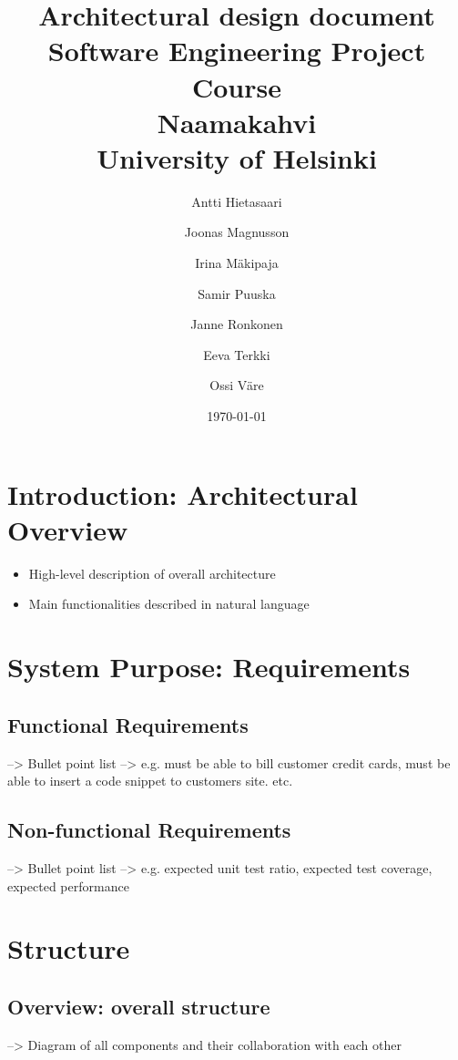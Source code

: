 \documentclass[11pt]{article}
\title{Architectural design document\\
  Software Engineering Project Course\\
  Naamakahvi\\
  University of Helsinki}
\author{Antti Hietasaari
  \and Joonas Magnusson
  \and Irina Mäkipaja
  \and Samir Puuska
  \and Janne Ronkonen
  \and Eeva Terkki
  \and Ossi Väre}
\date{\today}
\begin{document}
\maketitle

\setcounter{tocdepth}{3}
\tableofcontents
\vspace*{1cm}



\section{Introduction: Architectural Overview}
\label{sec-1}
\begin{itemize}
\item High-level description of overall architecture
\item Main functionalities described in natural language
\end{itemize}
\section{System Purpose: Requirements}
\label{sec-2}

\subsection{Functional Requirements}
\label{sec-2.1}

   --> Bullet point list
   --> e.g. must be able to bill customer credit cards, must be able to
   insert a code snippet to customers site. etc.

\subsection{Non-functional Requirements}
\label{sec-2.2}

   --> Bullet point list
   --> e.g. expected unit test ratio, expected test coverage, expected
   performance


\section{Structure}
\label{sec-3}

\subsection{Overview: overall structure}
\label{sec-3.1}

   --> Diagram of all components and their collaboration with each other
\end{document}
